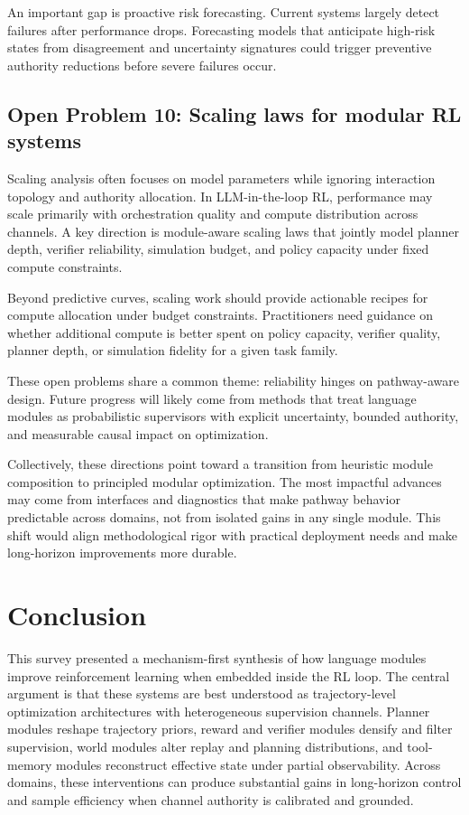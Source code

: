 \documentclass[pdflatex,sn-mathphys-num]{sn-jnl}
\begin{document}
An important gap is proactive risk forecasting. Current systems largely detect failures after performance drops. Forecasting models that anticipate high-risk states from disagreement and uncertainty signatures could trigger preventive authority reductions before severe failures occur.

\subsection{Open Problem 10: Scaling laws for modular RL systems}
Scaling analysis often focuses on model parameters while ignoring interaction topology and authority allocation. In LLM-in-the-loop RL, performance may scale primarily with orchestration quality and compute distribution across channels. A key direction is module-aware scaling laws that jointly model planner depth, verifier reliability, simulation budget, and policy capacity under fixed compute constraints.

Beyond predictive curves, scaling work should provide actionable recipes for compute allocation under budget constraints. Practitioners need guidance on whether additional compute is better spent on policy capacity, verifier quality, planner depth, or simulation fidelity for a given task family.

These open problems share a common theme: reliability hinges on pathway-aware design. Future progress will likely come from methods that treat language modules as probabilistic supervisors with explicit uncertainty, bounded authority, and measurable causal impact on optimization.

Collectively, these directions point toward a transition from heuristic module composition to principled modular optimization. The most impactful advances may come from interfaces and diagnostics that make pathway behavior predictable across domains, not from isolated gains in any single module. This shift would align methodological rigor with practical deployment needs and make long-horizon improvements more durable.

\section{Conclusion}
This survey presented a mechanism-first synthesis of how language modules improve reinforcement learning when embedded inside the RL loop. The central argument is that these systems are best understood as trajectory-level optimization architectures with heterogeneous supervision channels. Planner modules reshape trajectory priors, reward and verifier modules densify and filter supervision, world modules alter replay and planning distributions, and tool-memory modules reconstruct effective state under partial observability. Across domains, these interventions can produce substantial gains in long-horizon control and sample efficiency when channel authority is calibrated and grounded.
\end{document}
